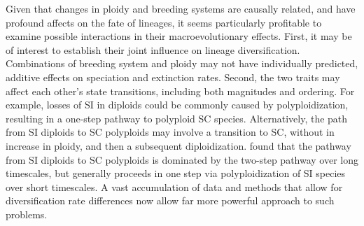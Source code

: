Given that changes in ploidy and breeding systems are causally related, and have profound affects on the fate of lineages, it seems particularly profitable to examine possible interactions in their macroevolutionary effects.
First, it may be of interest to establish their joint influence on lineage diversification.
Combinations of breeding system and ploidy may not have individually predicted, additive effects on speciation and extinction rates.
Second, the two traits may affect each other's state transitions, including both magnitudes and ordering.
For example, losses of SI in diploids could be commonly caused by polyploidization, resulting in a one-step pathway to polyploid SC species. 
Alternatively, the path from SI diploids to SC polyploids may involve a transition to SC, without in increase in ploidy, and then a subsequent diploidization. 
\citet{robertson_2011} found that the pathway from SI diploids to SC polyploids is dominated by the two-step pathway over long timescales, but generally proceeds in one step via polyploidization of SI species over short timescales.
A vast accumulation of data and methods that allow for diversification rate differences now allow far more powerful approach to such problems.

